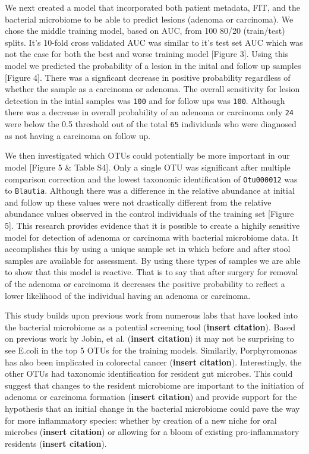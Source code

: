 \documentclass[12pt,]{article}
\begin{document}
We next created a model that incorporated both patient metadata, FIT,
and the bacterial microbiome to be able to predict lesions (adenoma or
carcinoma). We chose the middle training model, based on AUC, from 100
80/20 (train/test) splits. It's 10-fold cross validated AUC was similar
to it's test set AUC which was not the case for both the best and worse
training model {[}Figure 3{]}. Using this model we predicted the
probability of a lesion in the inital and follow up samples {[}Figure
4{]}. There was a signficant decrease in positive probability regardless
of whether the sample as a carcinoma or adenoma. The overall sensitivity
for lesion detection in the intial samples was \texttt{100} and for
follow ups was \texttt{100}. Although there was a decrease in overall
probability of an adenoma or carcinoma only \texttt{24} were below the
0.5 threshold out of the total \texttt{65} individuals who were
diagnosed as not having a carcinoma on follow up.

We then investigated which OTUs could potentially be more important in
our model {[}Figure 5 \& Table S4{]}. Only a single OTU was significant
after multiple comparison correction and the lowest taxonomic
identification of \texttt{Otu000012} was to \texttt{Blautia}. Although
there was a difference in the relative abundance at initial and follow
up these values were not drastically different from the relative
abundance values observed in the control individuals of the training set
{[}Figure 5{]}. This research provides evidence that it is possible to
create a highily sensitive model for detection of adenoma or carcinoma
with bacterial microbiome data. It accomplishes this by using a unique
sample set in which before and after stool samples are available for
assessment. By using these types of samples we are able to show that
this model is reactive. That is to say that after surgery for removal of
the adenoma or carcinoma it decreases the positive probability to
reflect a lower likelihood of the individual having an adenoma or
carcinoma.

This study builds upon previous work from numerous labs that have looked
into the bacterial microbiome as a potential screening tool
(\textbf{insert citation}). Based on previous work by Jobin, et al.
(\textbf{insert citation}) it may not be surprising to see E.coli in the
top 5 OTUs for the training models. Similarily, Porphyromonas has also
been implicated in colorectal cancer (\textbf{insert citation}).
Interestingly, the other OTUs had taxonomic identification for resident
gut microbes. This could suggest that changes to the resident microbiome
are important to the initiation of adenoma or carcinoma formation
(\textbf{insert citation}) and provide support for the hypothesis that
an initial change in the bacterial microbiome could pave the way for
more inflammatory species: whether by creation of a new niche for oral
microbes (\textbf{insert citation}) or allowing for a bloom of existing
pro-inflammatory residents (\textbf{insert citation}).
\end{document}
